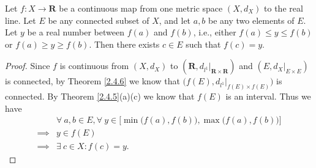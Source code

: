 \begin{corollary}\label{2.4.7}
    Let \(f : X \to \mathbf{R}\) be a continuous map from one metric space \((X, d_X)\) to the real line.
    Let \(E\) be any connected subset of \(X\), and let \(a, b\) be any two elements of \(E\).
    Let \(y\) be a real number between \(f(a)\) and \(f(b)\), i.e., either \(f(a) \leq y \leq f(b)\) or \(f(a) \geq y \geq f(b)\).
    Then there exists \(c \in E\) such that \(f(c) = y\).
\end{corollary}

\begin{proof}
    Since \(f\) is continuous from \((X, d_X)\) to \((\mathbf{R}, d_{l^1}|_{\mathbf{R} \times \mathbf{R}})\) and \((E, d_X|_{E \times E})\) is connected, by Theorem \ref{2.4.6} we know that \(\big(f(E), d_{l^1}|_{f(E) \times f(E)}\big)\) is connected.
    By Theorem \ref{2.4.5}(a)(c) we know that \(f(E)\) is an interval.
    Thus we have
    \begin{align*}
                 & \forall\ a, b \in E, \forall\ y \in \Big[\min\big(f(a), f(b)\big), \max\big(f(a), f(b)\big)\Big] \\
        \implies & y \in f(E)                                                                                       \\
        \implies & \exists\ c \in X : f(c) = y.
    \end{align*}
\end{proof}